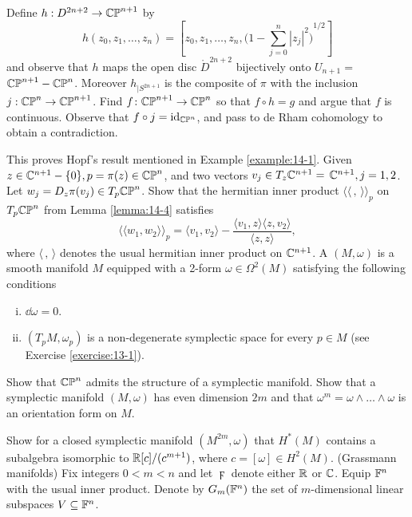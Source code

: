 \begin{enumerate}[label=\theexercise.\arabic*.,ref=\theexercise.\arabic*,leftmargin=2.7em]
    Define $h : {D}^{{2n} + 2} \rightarrow  {\ensuremath{\mathbb{{CP}}}}^{n + 1}$ by
    \[
      h( {{z}_{0},{z}_{1},\ldots,{z}_{n}})  = \left[  {{z}_{0},{z}_{1},\ldots,{z}_{n},{\bigg( 1- \sum_{{j = 0}}^{n}{\left| {z}_{j}\right| }^{2}\bigg) }^{1/2}}\right]
    \]
    and observe that $h$ maps the open disc ${\mathring{D}}^{{2n} + 2}$ bijectively onto ${U}_{n + 1} =$  ${\mathbb{{CP}}}^{n + 1}- {\mathbb{{CP}}}^{n}$. Moreover ${h}_{\mid {S}^{{2n} + 1}}$ is the composite of $\pi$ with the inclusion $j : {\mathbb{{CP}}}^{n} \rightarrow  {\ensuremath{\mathbb{{CP}}}}^{n + 1}$. Find $f\colon {\ensuremath{\mathbb{{CP}}}}^{n + 1} \rightarrow  {\ensuremath{\mathbb{{CP}}}}^{n}$ so that $f \circ  h = g$ and argue that $f$ is continuous. Observe that $f \circ  j = {\mathrm{id}}_{{\mathbb{{CP}}}^{n}}$, and pass to de Rham cohomology to obtain a contradiction.\par
    This proves Hopf's result mentioned in Example \ref{example:14-1}.
  \NewItem Given $z \in  {\ensuremath{\mathbb{C}}}^{n + 1}- \{ 0\},p = \pi ( z)  \in  {\ensuremath{\mathbb{{CP}}}}^{n}$, and two vectors ${v}_{j} \in  {T}_{z}{\mathbb{C}}^{n + 1} =$  ${\mathbb{C}}^{n + 1},j = 1,2$. Let ${w}_{j} = {D}_{z}\pi ( {v}_{j})  \in  {T}_{p}{\mathbb{{CP}}}^{n}$. Show that the hermitian inner product $\langle \langle\,,\,\rangle {\rangle }_{p}$ on ${T}_{p}{\mathbb{{CP}}}^{n}$ from Lemma \ref{lemma:14-4} satisfies
    \[
      {\langle  \langle  {w}_{1},{w}_{2}\rangle  \rangle  }_{p} = \langle  {{v}_{1},{v}_{2}}\rangle  - \frac{\langle  {{v}_{1},z}\rangle  \langle  {z,{v}_{2}}\rangle  }{\langle z,z\rangle },
    \]
    where $\langle\,,\, \rangle$ denotes the usual hermitian inner product on ${\mathbb{C}}^{n + 1}$.
  \NewItem A  $( {M,\omega })$ is a smooth manifold $M$ equipped with a 2-form $\omega  \in  {\Omega }^{2}( M)$ satisfying the following conditions
    \begin{enumerate}[(i)]
      \item ${\dd\omega } = 0$.
      \item $( {{T}_{p}M,{\omega }_{p}})$ is a non-degenerate symplectic space for every $p \in  M$%
      (see Exercise \ref{exercise:13-1}).
    \end{enumerate}
    Show that ${\mathbb{{CP}}}^{n}$ admits the structure of a symplectic manifold.
    Show that a symplectic manifold $( {M,\omega })$ has even dimension ${2m}$ and that ${\omega }^{m} = \omega  \land  \ldots  \land  \omega$ is an orientation form on $M$.\par
    Show for a closed symplectic manifold $( {{M}^{2m},\omega })$ that ${H}^*( M)$ contains a subalgebra isomorphic to $\mathbb{R}[  c]  /( {c}^{m + 1})$, where $c = [  \omega ]   \in  {H}^{2}( M)$.
  \NewItem (Grassmann manifolds) Fix integers $0 < m < n$ and let $\digamma$ denote either $\mathbb{R}$ or $\mathbb{C}$. Equip ${\mathbb{F}}^{n}$ with the usual inner product. Denote by ${G}_{m}( {\mathbb{F}}^{n})$ the set of $m$-dimensional linear subspaces $V \subseteq  {\ensuremath{\mathbb{F}}}^{n}$.

\end{enumerate}
